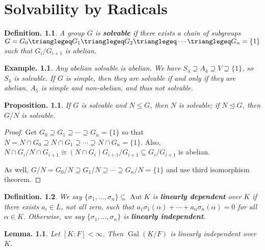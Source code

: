 \documentclass[11pt, a4paper]{memoir}
\newcommand{\mbf}[1]{{\boldmath\bfseries #1}}
\theoremstyle{change}
\newtheorem{lemma}[theorem]{Lemma.}
\newtheorem{proposition}[theorem]{Proposition.}
\theoremstyle{plain}
\theoremstyle{nonumberplain}
\newtheorem{definition}{Definition.}
\newtheorem{example}{Example.}
\newtheorem{proof}{Proof}
\DeclareMathOperator{\Aut}{Aut}
\DeclareMathOperator{\Gal}{Gal}
\numberwithin{equation}{section}
\begin{document}
\chapter{Solvability by Radicals}
\begin{definition}
    A group $G$ is \mbf{solvable} if there exists a chain of subgroups $G=G_0\trianglegeq G_1\trianglegeq G_2\trianglegeq\cdots\trianglegeq G_n=\{1\}$ such that $G_i/G_{i+1}$ is abelian.
\end{definition}
\begin{example}
    Any abelian solvable is abelian.
    We have $S_4\supseteq A_4\supseteq V\supseteq\{1\}$, so $S_4$ is solvable.
    If $G$ is simple, then they are solvable if and only if they are abelian.
    $A_5$ is simple and non-abelian, and thus not solvable.
\end{example}
\begin{proposition}
    If $G$ is solvable and $N\leq G$, then $N$ is solvable; if $N\trianglelefteq G$, then $G/N$ is solvable.
\end{proposition}
\begin{proof}
    Get $G_0\supseteq G_1\supseteq\cdots\supseteq G_n=\{1\}$ so that $N=N\cap G_0\supseteq N\cap G_1\supseteq\cdots\supseteq N\cap G_n=\{1\}$.
    Also, $N\cap G_i/N\cap G_{i+1}\cong (N\cap G_i)G_{i+1}/G_{i+1}\subseteq G_i/G_{i+1}$ is abelian.

    As well, $G/N=G_0/N\supseteq G_1/N\supseteq\cdots\supseteq G_n/N=\{1\}$ and use third isomorphism theorem.
\end{proof}
\begin{definition}
    We say $\{\sigma_1,\ldots,\sigma_n\}\subseteq\Aut K$ is \mbf{linearly dependent} over $K$ if there exists $a_i\in L$, not all zero, such that $a_1\sigma_1(\alpha)+\cdots+a_n\sigma_n(\alpha)=0$ for all $\alpha\in K$.
    Otherwise, we say $\{\sigma_1,\ldots,\sigma_n\}$ is \mbf{linearly independent}.
\end{definition}
\begin{lemma}
    Let $[K:F]<\infty$.
    Then $\Gal(K/F)$ is linearly independent over $K$.
\end{lemma}
\end{document}
